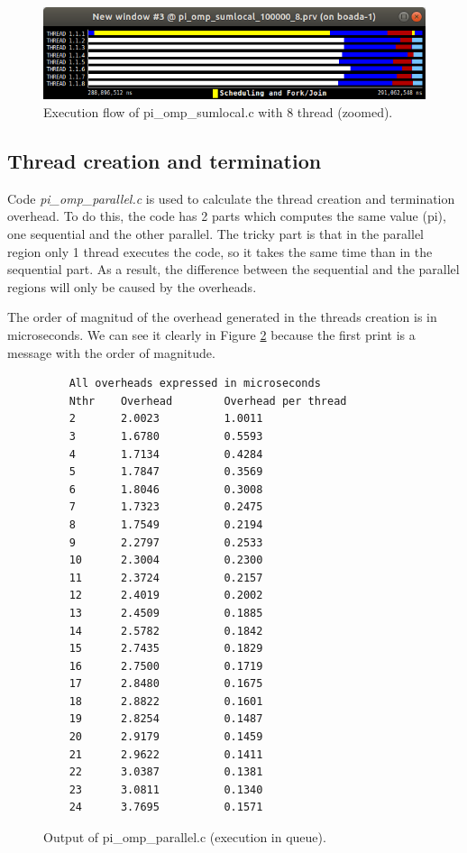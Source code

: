 \documentclass[12pt, a4paper]{article}
\begin{document}
\begin{figure}[H]
  \centering
  \includegraphics[scale=0.5]{./images/pi_omp_sumlocal_8_zoom}
  \caption{Execution flow of pi\_omp\_sumlocal.c with 8 thread (zoomed).}
  \label{pi_omp_sumlocal_8_zoom}
\end{figure}

\subsection{Thread creation and termination}

Code \textit{pi\_omp\_parallel.c} is used to calculate the thread creation and termination overhead. To do this, the code has 2 parts which computes the same value (pi), one sequential and the other parallel. The tricky part is that in the parallel region only 1 thread executes the code, so it takes the same time than in the sequential part. As a result, the difference between the sequential and the parallel regions will only be caused by the overheads.

The order of magnitud of the overhead generated in the threads creation is in microseconds. We can see it clearly in Figure \ref{piompparallel} because the first print is a message with the order of magnitude.

\begin{figure}[H]
	\begin{lstlisting}
	All overheads expressed in microseconds
	Nthr    Overhead        Overhead per thread
	2       2.0023          1.0011
	3       1.6780          0.5593
	4       1.7134          0.4284
	5       1.7847          0.3569
	6       1.8046          0.3008
	7       1.7323          0.2475
	8       1.7549          0.2194
	9       2.2797          0.2533
	10      2.3004          0.2300
	11      2.3724          0.2157
	12      2.4019          0.2002
	13      2.4509          0.1885
	14      2.5782          0.1842
	15      2.7435          0.1829
	16      2.7500          0.1719
	17      2.8480          0.1675
	18      2.8822          0.1601
	19      2.8254          0.1487
	20      2.9179          0.1459
	21      2.9622          0.1411
	22      3.0387          0.1381
	23      3.0811          0.1340
	24      3.7695          0.1571
	\end{lstlisting}
	\caption{Output of pi\_omp\_parallel.c (execution in queue).}
	\label{piompparallel}
\end{figure}
\end{document}
